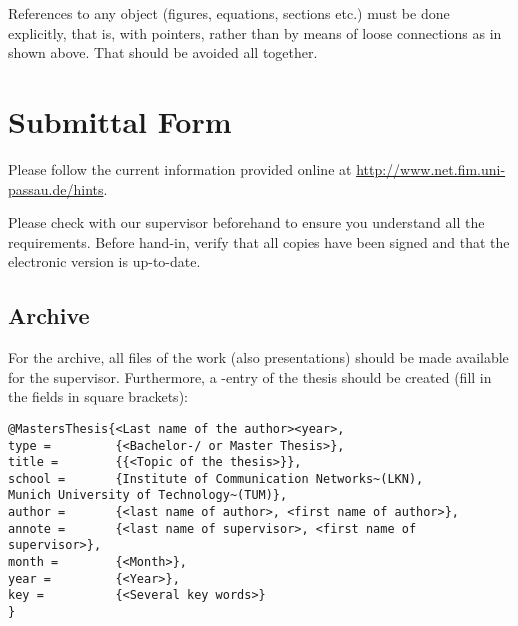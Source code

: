 References to any object (figures, equations, sections etc.) must be done
explicitly, that is, with pointers, rather than  by means of loose connections
as in shown above. That should be avoided all together. 

\section{Submittal Form}

Please follow the current information provided online at 
\url{http://www.net.fim.uni-passau.de/hints}.

Please check with our supervisor beforehand to ensure you understand all the requirements. Before hand-in, verify that all copies have been signed and that the electronic version is up-to-date.

\subsection{Archive}
For the archive, all files of the work (also presentations) should be made available for the supervisor.
Furthermore, a \BibTeX-entry of the thesis should be created (fill in the fields in square brackets):
\begin{verbatim}
@MastersThesis{<Last name of the author><year>,
type =         {<Bachelor-/ or Master Thesis>},
title =        {{<Topic of the thesis>}},
school =       {Institute of Communication Networks~(LKN),
Munich University of Technology~(TUM)},
author =       {<last name of author>, <first name of author>},
annote =       {<last name of supervisor>, <first name of supervisor>},
month =        {<Month>},
year =         {<Year>},
key =          {<Several key words>}
}
\end{verbatim}
